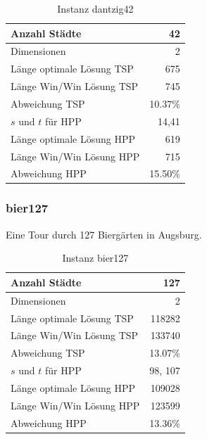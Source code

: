 \documentclass[11pt,a4paper]{article}
\begin{document}
        \begin{table}[H]
                \centering
                \begin{tabular}{| l | r |}
                    \hline
                        Anzahl Städte               & 42            \\ \hline
                        Dimensionen                 & 2             \\ \hline
                        Länge optimale Lösung TSP   & 675           \\ \hline
                        Länge Win/Win Lösung  TSP   & 745           \\ \hline
                        Abweichung TSP              & 10.37\%       \\ \hline
                        $s$ und $t$ für HPP         & 14,41         \\ \hline
                        Länge optimale Lösung HPP   & 619           \\ \hline
                        Länge Win/Win Lösung  HPP   & 715           \\ \hline
                        Abweichung HPP              & 15.50\%       \\ \hline
                \end{tabular}
                \caption{Instanz dantzig42}
                \label{tab:dantzig42}
        \end{table}

\subsubsection{bier127}
Eine Tour durch 127 Biergärten in Augsburg.

        \begin{table}[H]
                \centering
                \begin{tabular}{| l | r |}
                    \hline
                        Anzahl Städte               & 127           \\ \hline
                        Dimensionen                 & 2             \\ \hline
                        Länge optimale Lösung TSP   & 118282        \\ \hline
                        Länge Win/Win Lösung  TSP   & 133740        \\ \hline
                        Abweichung TSP              & 13.07\%       \\ \hline
                        $s$ und $t$ für HPP         & 98, 107       \\ \hline
                        Länge optimale Lösung HPP   & 109028        \\ \hline
                        Länge Win/Win Lösung  HPP   & 123599        \\ \hline
                        Abweichung HPP              & 13.36\%       \\ \hline
                \end{tabular}
                \caption{Instanz bier127}
                \label{tab:bier127}
        \end{table}
\end{document}
